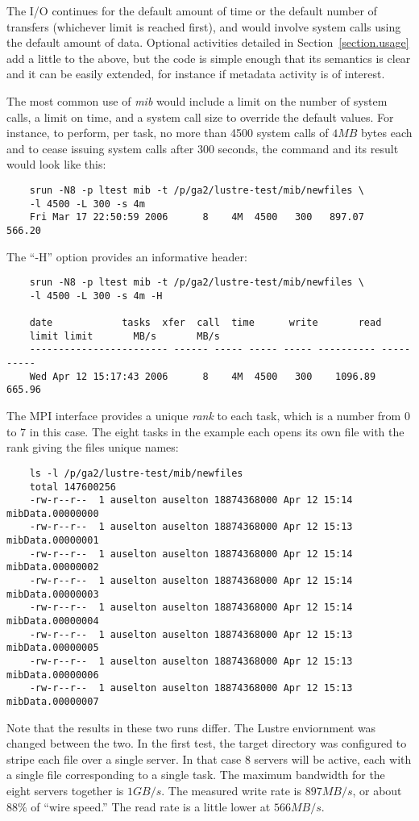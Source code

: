 \documentclass{article}
\begin{document}
The I/O continues for the default amount of time or the default number
of transfers (whichever limit is reached first), and would involve
system calls using the default amount of data.  Optional activities
detailed in Section~\ref{section.usage} add a little to the above, but
the code is simple enough that its semantics is clear and it can be
easily extended, for instance if metadata activity is of interest.

The most common use of {\em mib} would include a limit on the number
of system calls, a limit on time, and a system call size to override
the default values.  For instance, to perform, per task, no more than
4500 system calls of $4MB$ bytes each and to cease issuing system
calls after 300 seconds, the command and its result would look like
this:
{\small
  \begin{verbatim}
    srun -N8 -p ltest mib -t /p/ga2/lustre-test/mib/newfiles \
    -l 4500 -L 300 -s 4m
    Fri Mar 17 22:50:59 2006      8    4M  4500   300	897.07     566.20
  \end{verbatim}
}
\pagebreak
The ``-H'' option provides an informative header:
{\small
  \begin{verbatim}
    srun -N8 -p ltest mib -t /p/ga2/lustre-test/mib/newfiles \
    -l 4500 -L 300 -s 4m -H
    
    date            tasks  xfer  call  time      write       read
    limit limit       MB/s       MB/s
    ------------------------ ------ ----- ----- ----- ---------- ----------
    Wed Apr 12 15:17:43 2006      8    4M  4500   300    1096.89     665.96
  \end{verbatim}
}

The MPI interface provides a unique {\em rank} to each task, which is
a number from $0$ to $7$ in this case.  The eight tasks in
the example each opens its own file with the rank giving the files
unique names:
{\small
  \begin{verbatim}
    ls -l /p/ga2/lustre-test/mib/newfiles
    total 147600256
    -rw-r--r--  1 auselton auselton 18874368000 Apr 12 15:14 mibData.00000000
    -rw-r--r--  1 auselton auselton 18874368000 Apr 12 15:13 mibData.00000001
    -rw-r--r--  1 auselton auselton 18874368000 Apr 12 15:14 mibData.00000002
    -rw-r--r--  1 auselton auselton 18874368000 Apr 12 15:14 mibData.00000003
    -rw-r--r--  1 auselton auselton 18874368000 Apr 12 15:14 mibData.00000004
    -rw-r--r--  1 auselton auselton 18874368000 Apr 12 15:13 mibData.00000005
    -rw-r--r--  1 auselton auselton 18874368000 Apr 12 15:13 mibData.00000006
    -rw-r--r--  1 auselton auselton 18874368000 Apr 12 15:13 mibData.00000007
  \end{verbatim}
} 
Note that the results in these two runs differ.  The Lustre
enviornment was changed between the two.  In the first test, the
target directory was configured to stripe each file over a single
server.  In that case 8 servers will be active, each with a single
file corresponding to a single task.  The maximum bandwidth for the
eight servers together is $1GB/s$.  The measured write rate is $897
MB/s$, or about $88\%$ of ``wire speed.''  The read rate is a little
lower at $566 MB/s$.
\end{document}
